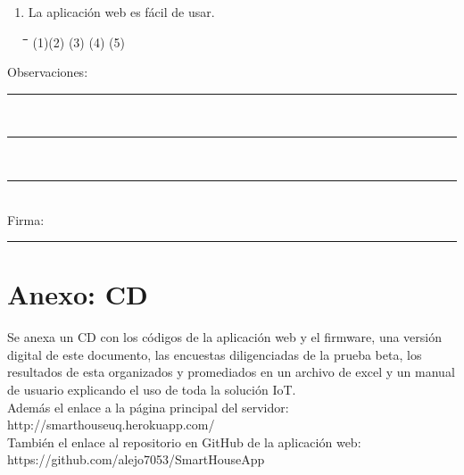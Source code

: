\begin{appendix}
\begin{enumerate}
	\item La aplicación web es fácil de usar.

\begin{tabbing}
	\hspace{2cm}\=\hspace{2cm}\=\hspace{2cm}\=\hspace{2cm}\=\kill
	(1)\>(2)  \>(3)  \>(4)  \>(5) 
\end{tabbing} 

\end{enumerate}

Observaciones: \rule{13.5cm}{0.1mm}\\
\rule{16.3cm}{0.1mm}\\
\rule{16.3cm}{0.1mm}\\

Firma: \rule{5cm}{0.1mm}

\chapter{Anexo: CD}\label{AnexoC}

Se anexa un CD con los códigos de la aplicación web y el firmware, una versión digital de este documento, las encuestas diligenciadas de la prueba beta, los resultados de esta organizados y promediados en un archivo de excel y un manual de usuario explicando el uso de toda la solución IoT.\\

Además el enlace a la página principal del servidor: http://smarthouseuq.herokuapp.com/\\

También el enlace al repositorio en GitHub de la aplicación web:\\ https://github.com/alejo7053/SmartHouseApp

\end{appendix}
